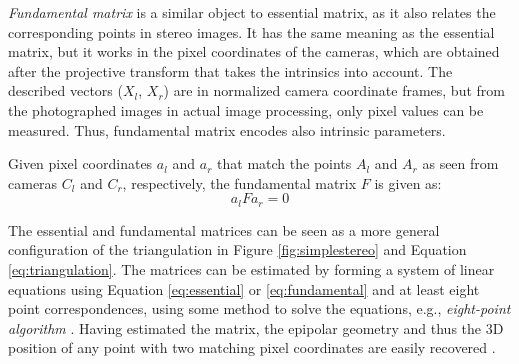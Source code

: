 
\emph{Fundamental matrix} \cite[ch. 11]{hartley03multiview} is a similar object to essential matrix, as it also relates the corresponding points in stereo images.
It has the same meaning as the essential matrix, but it works in the pixel coordinates of the cameras, which are obtained after the projective transform that takes the intrinsics into account.
The described vectors ($X_l$, $X_r$) are in normalized camera coordinate frames, but from the photographed images in actual image processing, only pixel values can be measured.
Thus, fundamental matrix encodes also intrinsic parameters.

Given pixel coordinates $a_l$ and $a_r$ that match the points $A_l$ and $A_r$ as seen from cameras $C_l$ and $C_r$, respectively, the fundamental matrix $F$ is given as:
\begin{equation} \label{eq:fundamental}
	a_l F a_r = 0
\end{equation}

%
%

The essential and fundamental matrices can be seen as a more general configuration of the triangulation in Figure \ref{fig:simplestereo} and Equation \ref{eq:triangulation}.
The matrices can be estimated by forming a system of linear equations using Equation \ref{eq:essential} or \ref{eq:fundamental} and at least eight point correspondences, using some method to solve the equations, e.g., \emph{eight-point algorithm} \cite[p. 155]{hartley03multiview}.
Having estimated the matrix, the epipolar geometry and thus the 3D position of any point with two matching pixel coordinates are easily recovered \cite[p. 162]{hartley03multiview}.

